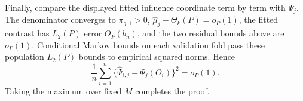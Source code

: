Finally, compare the displayed fitted influence coordinate term by term with \(\Psi_j\).  The denominator converges to \(\pi_{g,1}>0\), \(\widehat\mu_j-\Theta_k(P)=o_P(1)\), the fitted contrast has \(L_2(P)\) error \(O_P(b_n)\), and the two residual bounds above are \(o_P(1)\).  Conditional Markov bounds on each validation fold pass these population \(L_2(P)\) bounds to empirical squared norms.  Hence
\[
 \frac1n\sum_{i=1}^n\{\widehat\Psi_{i,j}-\Psi_j(O_i)\}^2=o_P(1).
\]
Taking the maximum over fixed \(M\) completes the proof.